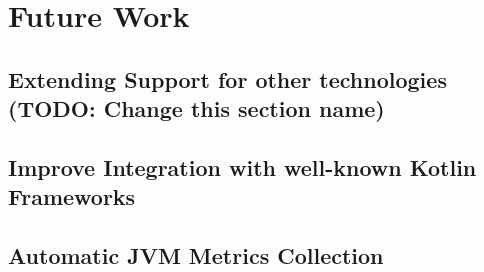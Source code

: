 \chapter{Future Work} \label{cap:future}


\section{Extending Support for other technologies (TODO: Change this section name)}
\lipsum[1]


\section{Improve Integration with well-known Kotlin Frameworks}
\lipsum[1]


\section{Automatic JVM Metrics Collection}
\lipsum[1]
